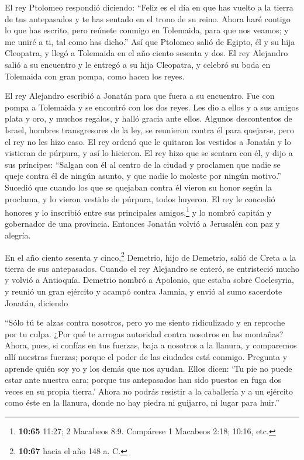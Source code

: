  El rey Ptolomeo respondió diciendo: ``Feliz es el día en
que has vuelto a la tierra de tus antepasados y te has sentado en el
trono de su reino.  Ahora haré contigo lo que has
escrito, pero reúnete conmigo en Tolemaida, para que nos veamos; y me
uniré a ti, tal como has dicho.''  Así que Ptolomeo salió
de Egipto, él y su hija Cleopatra, y llegó a Tolemaida en el año ciento
sesenta y dos.  El rey Alejandro salió a su encuentro y
le entregó a su hija Cleopatra, y celebró su boda en Tolemaida con gran
pompa, como hacen los reyes.

 El rey Alejandro escribió a Jonatán para que fuera a su
encuentro.  Fue con pompa a Tolemaida y se encontró con
los dos reyes. Les dio a ellos y a sus amigos plata y oro, y muchos
regalos, y halló gracia ante ellos.  Algunos descontentos
de Israel, hombres transgresores de la ley, se reunieron contra él para
quejarse, pero el rey no les hizo caso.  El rey ordenó
que le quitaran los vestidos a Jonatán y lo vistieran de púrpura, y así
lo hicieron.  El rey hizo que se sentara con él, y dijo a
sus príncipes: ``Salgan con él al centro de la ciudad y proclamen que
nadie se queje contra él de ningún asunto, y que nadie lo moleste por
ningún motivo.''  Sucedió que cuando los que se quejaban
contra él vieron su honor según la proclama, y lo vieron vestido de
púrpura, todos huyeron.  El rey le concedió honores y lo
inscribió entre sus principales amigos,\footnote{\textbf{10:65} 11:27; 2
  Macabeos 8:9. Compárese 1 Macabeos 2:18; 10:16, etc.} y lo nombró
capitán y gobernador de una provincia.  Entonces Jonatán
volvió a Jerusalén con paz y alegría.

 En el año ciento sesenta y cinco,\footnote{\textbf{10:67}
  hacia el año 148 a. C.} Demetrio, hijo de Demetrio, salió de Creta a
la tierra de sus antepasados.  Cuando el rey Alejandro se
enteró, se entristeció mucho y volvió a Antioquía. 
Demetrio nombró a Apolonio, que estaba sobre Coelesyria, y reunió un
gran ejército y acampó contra Jamnia, y envió al sumo sacerdote Jonatán,
diciendo

 ``Sólo tú te alzas contra nosotros, pero yo me siento
ridiculizado y en reproche por tu culpa. ¿Por qué te arrogas autoridad
contra nosotros en las montañas?  Ahora, pues, si confías
en tus fuerzas, baja a nosotros a la llanura, y comparemos allí nuestras
fuerzas; porque el poder de las ciudades está conmigo. 
Pregunta y aprende quién soy yo y los demás que nos ayudan. Ellos dicen:
`Tu pie no puede estar ante nuestra cara; porque tus antepasados han
sido puestos en fuga dos veces en su propia tierra.' 
Ahora no podrás resistir a la caballería y a un ejército como éste en la
llanura, donde no hay piedra ni guijarro, ni lugar para huir.''

